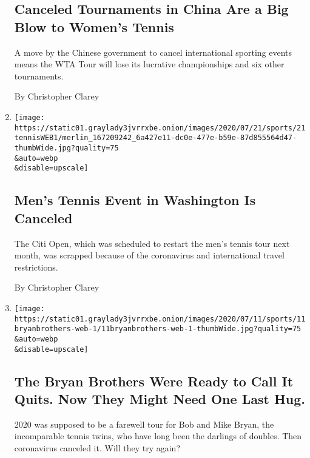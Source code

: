 \begin{enumerate}
  \hypertarget{canceled-tournaments-in-china-are-a-big-blow-to-womens-tennis}{%
  \subsection{Canceled Tournaments in China Are a Big Blow to Women's
  Tennis}\label{canceled-tournaments-in-china-are-a-big-blow-to-womens-tennis}}

  A move by the Chinese government to cancel international sporting
  events means the WTA Tour will lose its lucrative championships and
  six other tournaments.

  By Christopher Clarey
\item
  \href{/2020/07/21/sports/citi-open-washington-canceled.html}{}

  \texttt{[image: https://static01.graylady3jvrrxbe.onion/images/2020/07/21/sports/21tennisWEB1/merlin\_167209242\_6a427e11-dc0e-477e-b59e-87d855564d47-thumbWide.jpg?quality=75\\\&auto=webp\\\&disable=upscale]}

  \hypertarget{mens-tennis-event-in-washington-is-canceled}{%
  \subsection{Men's Tennis Event in Washington Is
  Canceled}\label{mens-tennis-event-in-washington-is-canceled}}

  The Citi Open, which was scheduled to restart the men's tennis tour
  next month, was scrapped because of the coronavirus and international
  travel restrictions.

  By Christopher Clarey
\item
  \href{/2020/07/11/sports/tennis/Bryan-brothers.html}{}

  \texttt{[image: https://static01.graylady3jvrrxbe.onion/images/2020/07/11/sports/11bryanbrothers-web-1/11bryanbrothers-web-1-thumbWide.jpg?quality=75\\\&auto=webp\\\&disable=upscale]}

  \hypertarget{the-bryan-brothers-were-ready-to-call-it-quits-now-they-might-need-one-last-hug}{%
  \subsection{The Bryan Brothers Were Ready to Call It Quits. Now They
  Might Need One Last
  Hug.}\label{the-bryan-brothers-were-ready-to-call-it-quits-now-they-might-need-one-last-hug}}

  2020 was supposed to be a farewell tour for Bob and Mike Bryan, the
  incomparable tennis twins, who have long been the darlings of doubles.
  Then coronavirus canceled it. Will they try again?


\end{enumerate}

